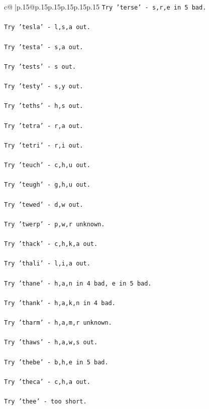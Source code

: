\documentclass{article}
\begin{document}
{\begin{supertabular}{c@{$\;$}|p{.15\linewidth}@{}p{.15\linewidth}p{.15\linewidth}p{.15\linewidth}p{.15\linewidth}p{.15\linewidth}}
{{{\texttt{Try 'terse' {-} s,r,e in 5 bad.} \\
\\ 
\texttt{Try 'tesla' {-} l,s,a out.} \\
\\ 
\texttt{Try 'testa' {-} s,a out.} \\
\\ 
\texttt{Try 'tests' {-} s out.} \\
\\ 
\texttt{Try 'testy' {-} s,y out.} \\
\\ 
\texttt{Try 'teths' {-} h,s out.} \\
\\ 
\texttt{Try 'tetra' {-} r,a out.} \\
\\ 
\texttt{Try 'tetri' {-} r,i out.} \\
\\ 
\texttt{Try 'teuch' {-} c,h,u out.} \\
\\ 
\texttt{Try 'teugh' {-} g,h,u out.} \\
\\ 
\texttt{Try 'tewed' {-} d,w out.} \\
\\ 
\texttt{Try 'twerp' {-} p,w,r unknown.} \\
\\ 
\texttt{Try 'thack' {-} c,h,k,a out.} \\
\\ 
\texttt{Try 'thali' {-} l,i,a out.} \\
\\ 
\texttt{Try 'thane' {-} h,a,n in 4 bad, e in 5 bad.} \\
\\ 
\texttt{Try 'thank' {-} h,a,k,n in 4 bad.} \\
\\ 
\texttt{Try 'tharm' {-} h,a,m,r unknown.} \\
\\ 
\texttt{Try 'thaws' {-} h,a,w,s out.} \\
\\ 
\texttt{Try 'thebe' {-} b,h,e in 5 bad.} \\
\\ 
\texttt{Try 'theca' {-} c,h,a out.} \\
\\ 
\texttt{Try 'thee' {-} too short.} \\
\\ 
}}}
\end{supertabular}}
\end{document}

